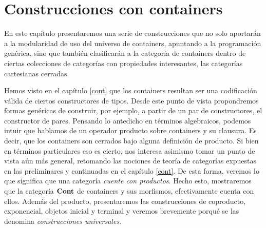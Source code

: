 \chapter{Construcciones con containers}\label{chapter:construcciones}

\begin{epigraphs}
\end{epigraphs}

En este capítulo presentaremos una serie de construcciones
que no solo aportarán a la modularidad de uso del universo de containers, apuntando a la programación genérica, sino que también clasificarán a la categoría de containers dentro de ciertas colecciones de categorías con propiedades interesantes, las categorías cartesianas cerradas.

Hemos visto en el capítulo \ref{cont} que los containers resultan ser una codificación válida de ciertos constructores de tipos. Desde este punto de vista propondremos formas genéricas de construir, por ejemplo, a partir de un par de constructores, el constructor de pares.
Pensando lo antedicho en términos algebraicos, podemos intuir que hablamos de un operador producto sobre containers y su clausura. Es decir, que los containers son cerrados bajo alguna definición de producto. Si bien en términos particulares eso es cierto, nos interesa asimismo tomar un punto de vista aún más general, retomando las nociones de teoría de categorías expuestas en las preliminares y continuadas en el capítulo \ref{cont}. De esta forma, veremos lo que significa que una categoría {\it cuente con productos}. Hecho esto, mostraremos que la categoría $\mathbf{Cont}$ de containers y sus morfismos, efectivamente cuenta con ellos.
Además del producto, presentaremos las construcciones de coproducto, exponencial, objetos inicial y terminal y veremos brevemente porqué se las denomina {\it construcciones universales}.

